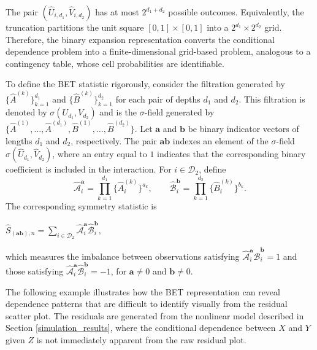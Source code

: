 \documentclass[12pt,reqno,oneside]{amsbook}
\theoremstyle{definition}
\theoremstyle{remark}
\begin{document}
\hspace{0.5cm}
The pair $(\hat{U}_{i,d_1},\hat{V}_{i,d_2})$ has at most $2^{d_1+d_2}$ possible outcomes. Equivalently, the truncation partitions the unit square $[0,1]\times[0,1]$ into a $2^{d_1}\times 2^{d_2}$ grid. Therefore, the binary expansion representation converts the conditional dependence problem into a finite-dimensional grid-based problem, analogous to a contingency table, whose cell probabilities are identifiable.

\hspace{0.5cm}
To define the BET statistic rigorously, consider the filtration generated by $\{\hat{A}^{(k)}\}_{k=1}^{d_1}$ and $\{\hat{B}^{(k)}\}_{k=1}^{d_2}$ for each pair of depths $d_1$ and $d_2$. This filtration is denoted by $\sigma(U_{d_1},V_{d_2})$ and is the $\sigma$-field generated by
$\{\hat{A}^{(1)},\ldots,\hat{A}^{(d_1)},\hat{B}^{(1)},\ldots,\hat{B}^{(d_2)}\}$.
Let $\mathbf{a}$ and $\mathbf{b}$ be binary indicator vectors of lengths $d_1$ and $d_2$, respectively. The pair $\mathbf{a}\mathbf{b}$ indexes an element of the $\sigma$-field $\sigma(\hat{U}_{d_1},\hat{V}_{d_2})$, where an entry equal to $1$ indicates that the corresponding binary coefficient is included in the interaction. For $i\in\mathcal{D}_2$, define
\[
\hat{\mathcal{A}}_i^{\mathbf{a}}
=
\prod_{k=1}^{d_1}
\{\hat{A}_{i}^{(k)}\}^{a_k},
\qquad
\hat{\mathcal{B}}_i^{\mathbf{b}}
=
\prod_{k=1}^{d_2}
\{\hat{B}_{i}^{(k)}\}^{b_k}.
\]
The corresponding symmetry statistic is
\begin{center}
$\hat{S}_{(\mathbf{ab}),n}=\sum_{i\in\mathcal{D}_2}\hat{\mathcal{A}}_i^{\mathbf{a}}\hat{\mathcal{B}}_i^{\mathbf{b}},$
\end{center}
which measures the imbalance between observations satisfying
$\hat{\mathcal{A}}_i^{\mathbf{a}}\hat{\mathcal{B}}_i^{\mathbf{b}}=1$
and those satisfying
$\hat{\mathcal{A}}_i^{\mathbf{a}}\hat{\mathcal{B}}_i^{\mathbf{b}}=-1$, for $\mathbf{a}\neq0$ and $\mathbf{b}\neq0$.

\hspace{0.5cm}
The following example illustrates how the BET representation can reveal dependence patterns that are difficult to identify visually from the residual scatter plot. The residuals are generated from the nonlinear model described in Section \ref{simulation_results}, where the conditional dependence between $X$ and $Y$ given $Z$ is not immediately apparent from the raw residual plot.
\end{document}
